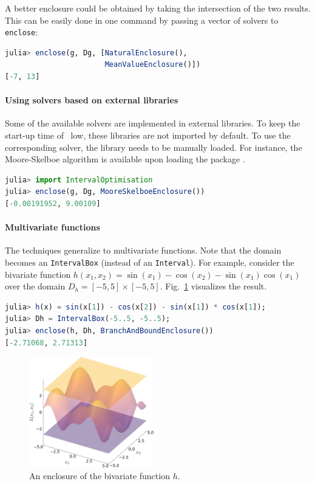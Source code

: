 \documentclass{juliacon}
\begin{document}
A better enclosure could be obtained by taking the intersection of the two results. This can be easily done in one command by passing a vector of solvers to \texttt{enclose}:

\begin{lstlisting}[language=Julia]
julia> enclose(g, Dg, [NaturalEnclosure(),
                       MeanValueEnclosure()])
[-7, 13]
\end{lstlisting}


\paragraph*{Using solvers based on external libraries}

Some of the available solvers are implemented in external libraries. To keep the start-up time of \emph{\RE}\ low, these libraries are not imported by default. To use the corresponding solver, the library needs to be manually loaded. For instance, the Moore-Skelboe algorithm is available upon loading the package .

\begin{lstlisting}[language=Julia]
julia> import IntervalOptimisation
julia> enclose(g, Dg, MooreSkelboeEnclosure())
[-0.00191952, 9.00109]
\end{lstlisting}


\paragraph*{Multivariate functions}

The techniques generalize to multivariate functions. Note that the domain becomes an \texttt{IntervalBox} (instead of an \texttt{Interval}). For example, consider the bivariate function $h(x_1, x_2) = \sin(x_1) - \cos(x_2) - \sin(x_1)\cos(x_1)$ over the domain $D_h = [-5, 5] \times [-5, 5]$. Fig.~\ref{fig:enclosure_3D} visualizes the result.

\begin{lstlisting}[language=Julia]
julia> h(x) = sin(x[1]) - cos(x[2]) - sin(x[1]) * cos(x[1]);
julia> Dh = IntervalBox(-5..5, -5..5);
julia> enclose(h, Dh, BranchAndBoundEnclosure())
[-2.71068, 2.71313]
\end{lstlisting}

\begin{figure}[t]
    \centering
    \includegraphics[width=\linewidth,height=48mm,keepaspectratio]{pic/enclosure_3D}
    \caption{An enclosure of the bivariate function $h$.}
    \label{fig:enclosure_3D}
\end{figure}
\end{document}

